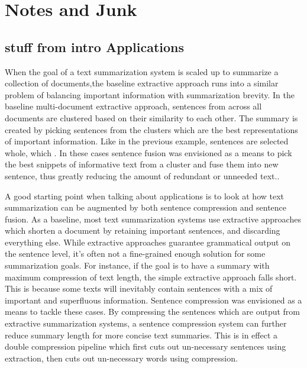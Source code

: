 \section{Notes and Junk}



\subsection{stuff from intro Applications}



{When the goal of a text summarization system is scaled up to summarize a collection of documents,the baseline extractive approach runs into a similar problem of balancing important information with summarization brevity. In the baseline multi-document extractive approach, sentences from across all documents are clustered based on their similarity to each other.  The summary is created by picking sentences from the clusters which are the best representations of important information.  Like in the previous example, sentences are selected whole, which . In these cases sentence fusion was envisioned as a means to pick the best snippets of informative text from a cluster and fuse them into new sentence, thus greatly reducing the amount of redundant or unneeded text.\citet{bla}.}




{A good starting point when talking about applications is to look at how text summarization can be augmented by both sentence compression and sentence fusion.  As a baseline, most text summarization systems use extractive approaches which shorten a document by retaining important sentences, and discarding everything else.  While extractive approaches guarantee grammatical output on the sentence level, it's often not a fine-grained enough solution for some summarization goals.  For instance, if the goal is to have a summary with maximum compression of text length, the simple extractive approach falls short.  This is because some texts will inevitably contain sentences with a mix of important and superfluous information.  Sentence compression was envisioned as a means to tackle these cases.  By compressing the sentences which are output from extractive summarization systems, a sentence compression system can further reduce summary length for more concise text summaries.  This is in effect a double compression pipeline which first cuts out un-necessary sentences using extraction, then cuts out un-necessary words using compression.}



